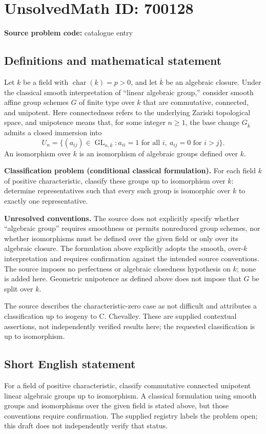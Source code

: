 \documentclass[11pt]{article}
\begin{document}
\section*{UnsolvedMath ID: 700128}
\textbf{Source problem code:} catalogue entry
\subsection{Definitions and mathematical statement}
Let \(k\) be a field with \(\operatorname{char}(k)=p>0\), and let \(\overline{k}\) be an algebraic closure. Under the classical smooth interpretation of ``linear algebraic group,'' consider smooth affine group schemes \(G\) of finite type over \(k\) that are commutative, connected, and unipotent. Here connectedness refers to the underlying Zariski topological space, and unipotence means that, for some integer \(n\geq 1\), the base change \(G_{\overline{k}}\) admits a closed immersion into
\[
U_n=\{(a_{ij})\in\operatorname{GL}_{n,\overline{k}}:a_{ii}=1\text{ for all }i,\ a_{ij}=0\text{ for }i>j\}.
\]
An isomorphism over \(k\) is an isomorphism of algebraic groups defined over \(k\).

\textbf{Classification problem (conditional classical formulation).} For each field \(k\) of positive characteristic, classify these groups up to isomorphism over \(k\): determine representatives such that every such group is isomorphic over \(k\) to exactly one representative.

\textbf{Unresolved conventions.} The source does not explicitly specify whether ``algebraic group'' requires smoothness or permits nonreduced group schemes, nor whether isomorphisms must be defined over the given field or only over its algebraic closure. The formulation above explicitly adopts the smooth, over-\(k\) interpretation and requires confirmation against the intended source conventions. The source imposes no perfectness or algebraic closedness hypothesis on \(k\); none is added here. Geometric unipotence as defined above does not impose that \(G\) be split over \(k\).

The source describes the characteristic-zero case as not difficult and attributes a classification up to isogeny to C. Chevalley. These are supplied contextual assertions, not independently verified results here; the requested classification is up to isomorphism.
\subsection{Short English statement}
For a field of positive characteristic, classify commutative connected unipotent linear algebraic groups up to isomorphism. A classical formulation using smooth groups and isomorphisms over the given field is stated above, but those conventions require confirmation. The supplied registry labels the problem open; this draft does not independently verify that status.
\end{document}

